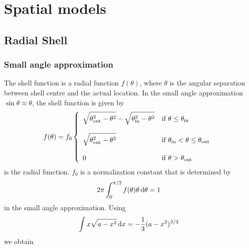 \documentclass{article}[12pt,a4]
\begin{document}
\section{Spatial models}

\subsection{Radial Shell}

\subsubsection{Small angle approximation}

The shell function is a radial function $f(\theta)$, where $\theta$ is the angular separation
between shell centre and the actual location.
In the small angle approximation $\sin \theta \approx \theta$, the shell function is given
by
\begin{equation}
f(\theta) = f_0 \left \{
   \begin{array}{l l}
      \displaystyle
      \sqrt{ \theta_{\rm out}^2 - \theta^2 } - \sqrt{ \theta_{\rm in}^2 - \theta^2 }
      & \mbox{if $\theta \le \theta_{\rm in}$} \\
      \\
     \displaystyle
      \sqrt{ \theta_{\rm out}^2 - \theta^2 }
      & \mbox{if $\theta_{\rm in} < \theta \le \theta_{\rm out}$} \\
      \\
     \displaystyle
     0 & \mbox{if $\theta > \theta_{\rm out}$}
   \end{array}
   \right .
\end{equation}
is the radial function.
$f_0$ is a normalization constant that is determined by
\begin{equation}
2 \pi \int_0^{\pi/2} f(\theta) \theta \, {\rm d}\theta = 1
\end{equation}
in the small angle approximation.
Using
\begin{equation}
\int x \sqrt {a-x^2} \, {\rm d}x = -\frac{1}{3} (a-x^2)^{3/2}
\end{equation}
we obtain
\end{document}
